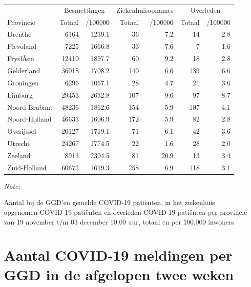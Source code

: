 \documentclass[
  english,
  man,floatsintext]{apa6}
\begin{document}
\begin{table}
\centering
\begin{threeparttable}
\begin{tabular}{lrrrrrr}
\toprule
\multicolumn{1}{c}{ } & \multicolumn{2}{c}{Besmettingen} & \multicolumn{2}{c}{Ziekenhuisopnames} & \multicolumn{2}{c}{Overleden} \\
\cmidrule(l{3pt}r{3pt}){2-3} \cmidrule(l{3pt}r{3pt}){4-5} \cmidrule(l{3pt}r{3pt}){6-7}
Provincie & Totaal & /100000 & Totaal & /100000 & Totaal & /100000\\
\midrule
Drenthe & 6164 & 1239.1 & 36 & 7.2 & 14 & 2.8\\
Flevoland & 7225 & 1666.8 & 33 & 7.6 & 7 & 1.6\\
FryslÃ¢n & 12410 & 1897.7 & 60 & 9.2 & 18 & 2.8\\
Gelderland & 36018 & 1708.2 & 140 & 6.6 & 139 & 6.6\\
Groningen & 6296 & 1067.1 & 28 & 4.7 & 21 & 3.6\\
Limburg & 29453 & 2632.8 & 107 & 9.6 & 97 & 8.7\\
Noord-Brabant & 48236 & 1862.6 & 154 & 5.9 & 107 & 4.1\\
Noord-Holland & 46633 & 1606.9 & 172 & 5.9 & 82 & 2.8\\
Overijssel & 20127 & 1719.1 & 71 & 6.1 & 42 & 3.6\\
Utrecht & 24267 & 1774.5 & 22 & 1.6 & 28 & 2.0\\
Zeeland & 8913 & 2304.5 & 81 & 20.9 & 13 & 3.4\\
Zuid-Holland & 60672 & 1619.3 & 258 & 6.9 & 118 & 3.1\\
\bottomrule
\end{tabular}
\begin{tablenotes}
\item \textit{Note: } 
\item Aantal bij de GGD’en gemelde COVID-19 patiënten, in het ziekenhuis opgenomen COVID-19 patiënten en overleden COVID-19 patiënten per provincie van 19 november t/m 03 december 10:00 uur, totaal en per 100.000 inwoners
\end{tablenotes}
\end{threeparttable}
\end{table}

\newpage

\hypertarget{aantal-covid-19-meldingen-per-ggd-in-de-afgelopen-twee-weken}{%
\section{Aantal COVID-19 meldingen per GGD in de afgelopen twee weken}\label{aantal-covid-19-meldingen-per-ggd-in-de-afgelopen-twee-weken}}
\end{document}
